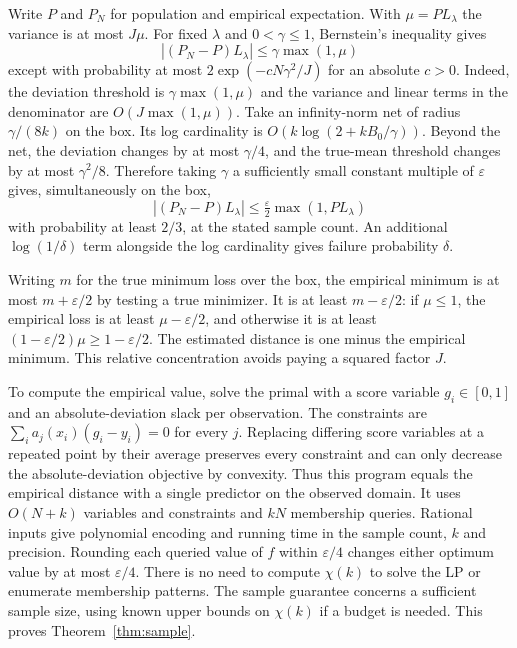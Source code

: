 \documentclass[11pt,a4paper]{amsart}
\begin{document}
Write $P$ and $P_N$ for population and empirical expectation. With $\mu=PL_\lambda$ the variance is at most $J\mu$. For fixed $\lambda$ and $0<\gamma\leq1$, Bernstein's inequality gives
\[
 |(P_N-P)L_\lambda|\leq\gamma\max(1,\mu)
\]
except with probability at most $2\exp(-cN\gamma^2/J)$ for an absolute $c>0$. Indeed, the deviation threshold is $\gamma\max(1,\mu)$ and the variance and linear terms in the denominator are $O(J\max(1,\mu))$. Take an infinity-norm net of radius $\gamma/(8k)$ on the box. Its log cardinality is $O(k\log(2+kB_0/\gamma))$. Beyond the net, the deviation changes by at most $\gamma/4$, and the true-mean threshold changes by at most $\gamma^2/8$. Therefore taking $\gamma$ a sufficiently small constant multiple of $\varepsilon$ gives, simultaneously on the box,
\[
 |(P_N-P)L_\lambda|\leq \tfrac{\varepsilon}{2}\max(1,PL_\lambda)
\]
with probability at least $2/3$, at the stated sample count. An additional $\log(1/\delta)$ term alongside the log cardinality gives failure probability $\delta$.

Writing $m$ for the true minimum loss over the box, the empirical minimum is at most $m+\varepsilon/2$ by testing a true minimizer. It is at least $m-\varepsilon/2$: if $\mu\leq1$, the empirical loss is at least $\mu-\varepsilon/2$, and otherwise it is at least $(1-\varepsilon/2)\mu\geq1-\varepsilon/2$. The estimated distance is one minus the empirical minimum. This relative concentration avoids paying a squared factor $J$.

To compute the empirical value, solve the primal with a score variable $g_i\in[0,1]$ and an absolute-deviation slack per observation. The constraints are $\sum_i a_j(x_i)(g_i-y_i)=0$ for every $j$. Replacing differing score variables at a repeated point by their average preserves every constraint and can only decrease the absolute-deviation objective by convexity. Thus this program equals the empirical distance with a single predictor on the observed domain. It uses $O(N+k)$ variables and constraints and $kN$ membership queries. Rational inputs give polynomial encoding and running time in the sample count, $k$ and precision. Rounding each queried value of $f$ within $\varepsilon/4$ changes either optimum value by at most $\varepsilon/4$. There is no need to compute $\chi(k)$ to solve the LP or enumerate membership patterns. The sample guarantee concerns a sufficient sample size, using known upper bounds on $\chi(k)$ if a budget is needed. This proves Theorem~\ref{thm:sample}.
\end{document}
